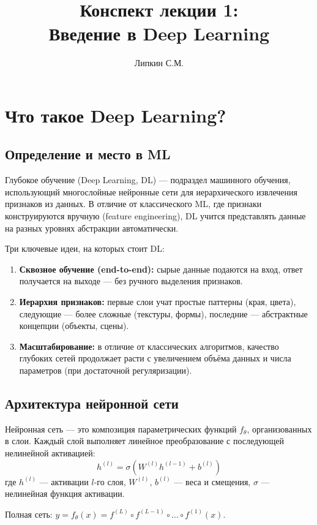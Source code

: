 \documentclass[a4paper,12pt]{article}
\title{Конспект лекции 1: \\ Введение в Deep Learning}
\author{Липкин С.М.}
\date{}
\begin{document}
\maketitle

\section{Что такое Deep Learning?}

\subsection{Определение и место в ML}

Глубокое обучение (Deep Learning, DL) — подраздел машинного обучения, использующий многослойные нейронные сети для иерархического извлечения признаков из данных. В отличие от классического ML, где признаки конструируются вручную (feature engineering), DL учится представлять данные на разных уровнях абстракции автоматически.

Три ключевые идеи, на которых стоит DL:
\begin{enumerate}
    \item \textbf{Сквозное обучение (end-to-end):} сырые данные подаются на вход, ответ получается на выходе — без ручного выделения признаков.
    \item \textbf{Иерархия признаков:} первые слои учат простые паттерны (края, цвета), следующие — более сложные (текстуры, формы), последние — абстрактные концепции (объекты, сцены).
    \item \textbf{Масштабирование:} в отличие от классических алгоритмов, качество глубоких сетей продолжает расти с увеличением объёма данных и числа параметров (при достаточной регуляризации).
\end{enumerate}

\subsection{Архитектура нейронной сети}

Нейронная сеть — это композиция параметрических функций $f_\theta$, организованных в слои. Каждый слой выполняет линейное преобразование с последующей нелинейной активацией:
\[
h^{(l)} = \sigma(W^{(l)} h^{(l-1)} + b^{(l)})
\]
где $h^{(l)}$ — активации $l$-го слоя, $W^{(l)}$, $b^{(l)}$ — веса и смещения, $\sigma$ — нелинейная функция активации.

Полная сеть: $y = f_\theta(x) = f^{(L)} \circ f^{(L-1)} \circ \dots \circ f^{(1)}(x)$.
\end{document}
